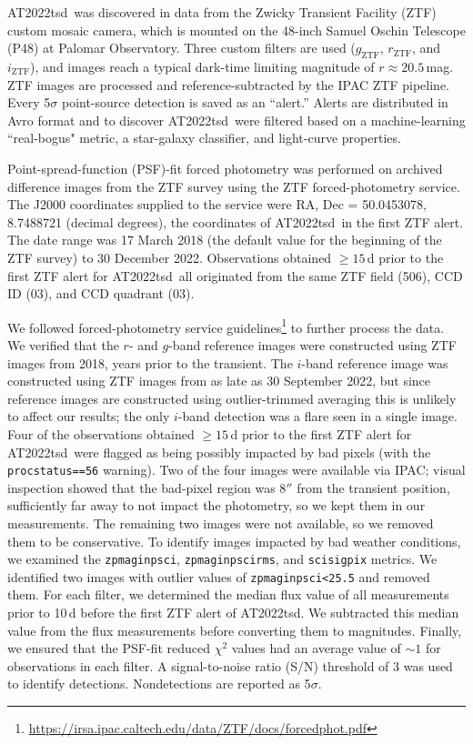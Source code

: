 \documentclass{nature_plusfigure}
\newcommand{\at}{AT2022tsd}
\begin{document}
\begin{methods}
\at\ was discovered in data from the Zwicky Transient Facility (ZTF\cite{Graham2019,Bellm2019}) custom mosaic camera\cite{Dekany2020}, which is mounted on the 48-inch Samuel Oschin Telescope (P48) at Palomar Observatory.
Three custom filters are used ($g_{\mathrm{ZTF}}$, $r_{\mathrm{ZTF}}$, and $i_{\mathrm{ZTF}}$\cite{Dekany2020}),
and images reach a typical dark-time limiting magnitude of $r\approx20.5\,$mag.
ZTF images are processed and reference-subtracted\cite{Zackay2016}
by the IPAC ZTF pipeline\cite{Masci2019}.
Every 5$\sigma$ point-source detection is saved as an ``alert.''
Alerts are distributed in Avro format\cite{Patterson2019} and to discover \at\ were filtered based on a machine-learning ``real-bogus" metric\cite{Duev2019}, a star-galaxy classifier\cite{Tachibana2018}, and light-curve properties.

Point-spread-function (PSF)-fit forced photometry was performed on archived difference images from the ZTF survey using the ZTF forced-photometry service\cite{Masci2019}. The J2000 coordinates supplied to the service were RA, Dec = 50.0453078, 8.7488721 (decimal degrees), the coordinates of \at\ in the first ZTF alert. The date range was 17 March 2018 (the default value for the beginning of the ZTF survey) to 30 December 2022.
Observations obtained $\geq 15$\,d prior to the first ZTF alert for \at\ all originated from the same ZTF field (506), CCD ID (03), and CCD quadrant (03). 

We followed forced-photometry service guidelines\footnote{\url{https://irsa.ipac.caltech.edu/data/ZTF/docs/forcedphot.pdf}} to further process the data.
We verified that the $r$- and $g$-band reference images were constructed using ZTF images from 2018, years prior to the transient. The $i$-band reference image was constructed using ZTF images from as late as 30 September 2022, but since reference images are constructed using outlier-trimmed averaging\cite{Masci2019} this is unlikely to affect our results; the only $i$-band detection was a flare seen in a single image. 
Four of the observations obtained $\geq 15$\,d prior to the first ZTF alert for \at\ were flagged as being possibly impacted by bad pixels (with the \texttt{procstatus==56} warning).
Two of the four images were available via IPAC; visual inspection showed that the bad-pixel region was 8$''$ from the transient position, sufficiently far away to not impact the photometry, so we kept them in our measurements.
The remaining two images were not available, so we removed them to be conservative.
To identify images impacted by bad weather conditions, we examined the \texttt{zpmaginpsci}, \texttt{zpmaginpscirms}, and \texttt{scisigpix} metrics. We identified two images with outlier values of \texttt{zpmaginpsci<25.5} and removed them.
For each filter, we determined the median flux value of all measurements prior to 10\,d before the first ZTF alert of \at. We subtracted this median value from the flux measurements before converting them to magnitudes.
Finally, we ensured that the PSF-fit reduced $\chi^2$ values had an average value of $\sim 1$ for observations in each filter.
A signal-to-noise ratio (S/N) threshold of 3 was used to identify detections. Nondetections are reported as 5$\sigma$.


\end{methods}
\end{document}
